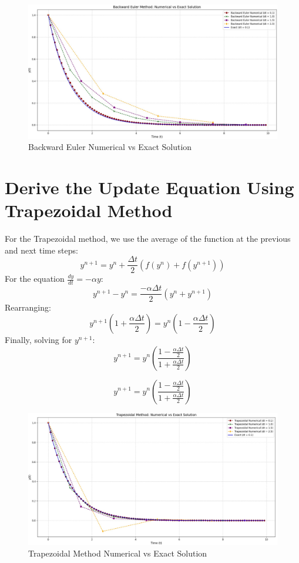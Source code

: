 \documentclass[11pt]{article}
\begin{document}
\begin{figure}[!ht]
    \centering
    \includegraphics[width= 1 \textwidth]{images/Backward Euler.jpg}
    \caption{Backward Euler Numerical vs Exact Solution}
    \label{fig:2}
  \end{figure}
  \FloatBarrier
\section{Derive the Update Equation Using Trapezoidal Method}

For the Trapezoidal method, we use the average of the function at the previous and next time steps:
\[
y^{n+1} = y^n + \frac{\Delta t}{2} \left( f(y^n) + f(y^{n+1}) \right)
\]
For the equation \(\frac{dy}{dt} = -\alpha y\):
\[
y^{n+1} - y^n = \frac{-\alpha \Delta t}{2} (y^n + y^{n+1})
\]
Rearranging:
\[
y^{n+1}(1 + \frac{\alpha \Delta t}{2}) = y^n \left(1 - \frac{\alpha \Delta t}{2}\right)
\]
Finally, solving for \(y^{n+1}\):
\[
y^{n+1} = y^n \left(\frac{1 - \frac{\alpha \Delta t}{2}}{1 + \frac{\alpha \Delta t}{2}}\right)
\]

\begin{tcolorbox}
\[
y^{n+1} = y^n \left(\frac{1 - \frac{\alpha \Delta t}{2}}{1 + \frac{\alpha \Delta t}{2}}\right)
\]
\end{tcolorbox}


\begin{figure}[!ht]
    \centering
    \includegraphics[width= 1 \textwidth]{images/Trapezoidal method.jpg}
    \caption{Trapezoidal Method Numerical vs Exact Solution}
    \label{fig:1}
  \end{figure}
  \FloatBarrier
\end{document}
